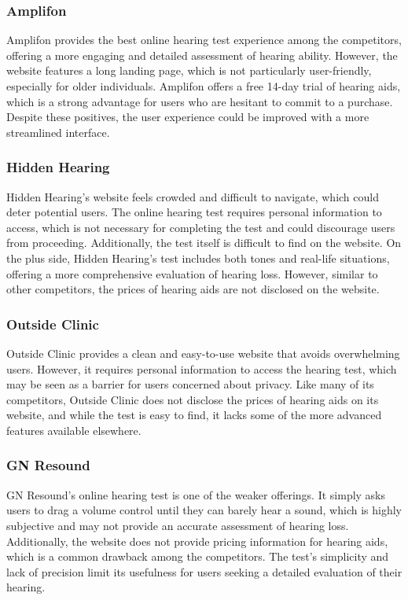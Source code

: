 \documentclass{article}
\begin{document}
\subsubsection{Amplifon}
Amplifon provides the best online hearing test experience among the competitors, offering a more engaging and detailed assessment of hearing ability. However, the website features a long landing page, which is not particularly user-friendly, especially for older individuals. Amplifon offers a free 14-day trial of hearing aids, which is a strong advantage for users who are hesitant to commit to a purchase. Despite these positives, the user experience could be improved with a more streamlined interface.

\subsubsection{Hidden Hearing}
Hidden Hearing’s website feels crowded and difficult to navigate, which could deter potential users. The online hearing test requires personal information to access, which is not necessary for completing the test and could discourage users from proceeding. Additionally, the test itself is difficult to find on the website. On the plus side, Hidden Hearing’s test includes both tones and real-life situations, offering a more comprehensive evaluation of hearing loss. However, similar to other competitors, the prices of hearing aids are not disclosed on the website.

\subsubsection{Outside Clinic}
Outside Clinic provides a clean and easy-to-use website that avoids overwhelming users. However, it requires personal information to access the hearing test, which may be seen as a barrier for users concerned about privacy. Like many of its competitors, Outside Clinic does not disclose the prices of hearing aids on its website, and while the test is easy to find, it lacks some of the more advanced features available elsewhere.

\subsubsection{GN Resound}
GN Resound’s online hearing test is one of the weaker offerings. It simply asks users to drag a volume control until they can barely hear a sound, which is highly subjective and may not provide an accurate assessment of hearing loss. Additionally, the website does not provide pricing information for hearing aids, which is a common drawback among the competitors. The test's simplicity and lack of precision limit its usefulness for users seeking a detailed evaluation of their hearing.
\end{document}
